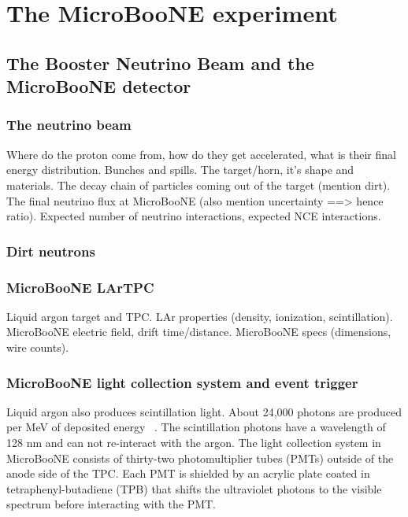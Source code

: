 \section{The MicroBooNE experiment}\label{microboone}

\subsection{The Booster Neutrino Beam and the MicroBooNE detector}\label{beam}
  \subsubsection{The neutrino beam}
    Where do the proton come from, how do they get accelerated, what is their
    final energy distribution.
    Bunches and spills.
    The target/horn, it's shape and materials.
    The decay chain of particles coming out of the target (mention dirt).
    The final neutrino flux at MicroBooNE (also mention uncertainty ==> hence ratio).
    Expected number of neutrino interactions, expected NCE interactions.
  \subsubsection{Dirt neutrons}
  \subsubsection{MicroBooNE LArTPC}
    Liquid argon target and TPC.
    LAr properties (density, ionization, scintillation).
    MicroBooNE electric field, drift time/distance.
    MicroBooNE specs (dimensions, wire counts).
  \subsubsection{MicroBooNE light collection system and event trigger}
    Liquid argon also produces scintillation light. About 24,000 photons are
    produced per MeV of deposited energy ~\cite{detectorpaper}. The
    scintillation photons have a wavelength of 128 nm and can not re-interact
    with the argon. The light collection system in MicroBooNE consists of
    thirty-two photomultiplier tubes (PMTs) outside of the anode side of the
    TPC. Each PMT is shielded by an acrylic plate coated in
    tetraphenyl-butadiene (TPB) that shifts the ultraviolet photons to the
    visible spectrum before interacting with the PMT.

